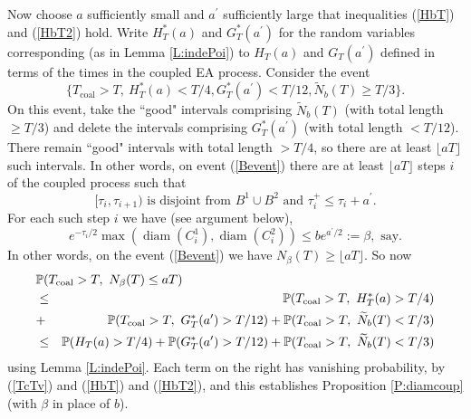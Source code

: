 \documentclass[12pt]{article}
\renewcommand{\Pr}{{\mathbb P}}
\newcommand{\Tcouple}{T_{\mathrm{coal}}}
\DeclareMathOperator{\diam}{diam}
\begin{document}
Now choose $a$ sufficiently small and $a^\prime$ sufficiently large that inequalities (\ref{HbT}) and (\ref{HbT2}) hold.
Write $H^*_T(a)$ and $G^*_T(a^\prime)$ for the random variables corresponding (as in Lemma  \ref{L:indePoi}) to $H_T(a)$ and   $G_T(a^\prime) $ 
defined in terms of the times in the coupled EA process.
Consider the event
 \begin{equation}
 \{\Tcouple > T, \ H^*_T(a)  < T/4,   G^*_T(a^\prime) < T/12,  \widetilde{N}_b(T) \ge T/3 \} .
\label{Bevent}
\end{equation} 
On this event, take the ``good" intervals comprising  $\widetilde{N}_b(T)$ (with total length $\ge T/3$) and delete the intervals 
comprising $G^*_T(a^\prime)$ (with total length $< T/12$).
There remain ``good" intervals with total length $>T/4$, so there are at least $\lfloor aT \rfloor$ such intervals.
In other words, on  event (\ref{Bevent})   there are
at least $\lfloor aT \rfloor$ steps $i$ of the coupled process such that
\begin{equation}
 [\tau_i, \tau_{i+1}) 
\mbox{ is disjoint from } 
B^1 \cup B^2 \mbox{ and } \tau^+_i \le \tau_i + a^\prime .
\label{suchstep}
\end{equation}
For each such step $i$ we have (see argument below),
\begin{equation}
e^{- \tau_i/2} 
\max( \diam(C^1_i), \diam (C^2_i) ) 
\le b e^{a^\prime/2} := \beta, \mbox{ say}.
\label{tCC2}
\end{equation} 
In other words, on the event (\ref{Bevent})  we have
$N_\beta(T) \ge  \lfloor aT \rfloor$. 
So now
\begin{eqnarray*}
\lefteqn{ \Pr(\Tcouple > T, \ N_\beta(T) \le aT)} \\
&  \le  &
\Pr( \Tcouple > T, \ H^*_T(a)  > T/4) \\
&+& \Pr( \Tcouple > T, \ G^*_T(a^\prime)  > T/12)
+ \Pr( \Tcouple > T, \  \widetilde{N}_b(T) < T/3 ) \\
&\le& \Pr( H_T(a)  > T/4) + \Pr (G^*_T(a^\prime)  > T/12)
+ \Pr( \Tcouple > T, \  \widetilde{N}_b(T) < T/3 )
\end{eqnarray*}
using Lemma \ref{L:indePoi}.
Each term on the right has vanishing probability, by  (\ref{TcTv}) and (\ref{HbT})  and (\ref{HbT2}), and this establishes  Proposition \ref{P:diamcoup} 
(with $\beta$ in place of $b$).
\end{document}
